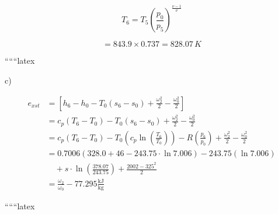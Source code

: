 \[
T_6 = T_5 \left( \frac{p_0}{p_5} \right)^{\frac{\nu - 1}{\nu}}
\]

\[
= 843.9 \times 0.737 = 828.07 \, K
\]

``````latex

c)

\begin{align*}
e_{xst} &= \left[ h_6 - h_0 - T_0 (s_6 - s_0) + \frac{\omega_2^2}{2} - \frac{\omega_0^2}{2} \right] \\
&= c_p (T_6 - T_0) - T_0 (s_6 - s_0) + \frac{\omega_2^2}{2} - \frac{\omega_0^2}{2} \\
&= c_p (T_6 - T_0) - T_0 \left( c_p \ln \left( \frac{T_6}{T_0} \right) \right) - R \left( \frac{p_6}{p_0} \right) + \frac{\omega_2^2}{2} - \frac{\omega_0^2}{2} \\
&= 0.7006 (328.0 + 46 - 243.75 \cdot \ln 7.006) - 243.75 \left( \ln 7.006 \right) \\
&\quad + s \cdot \ln \left( \frac{378.07}{243.75} \right) + \frac{2002 - 325^2}{2} \\
&= \frac{\omega_2}{\omega_0} - 77.295 \frac{\text{kJ}}{\text{kg}}
\end{align*}

``````latex


